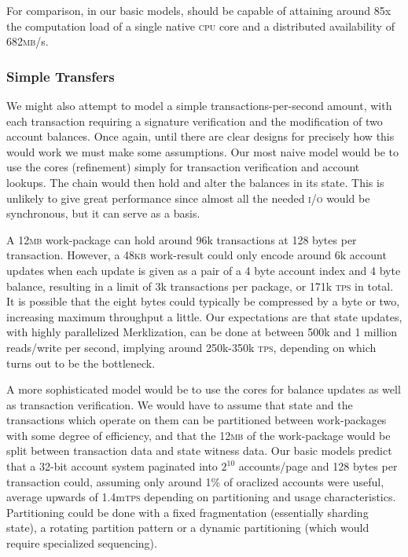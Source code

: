 For comparison, in our basic models, \Jam should be capable of attaining around 85x the computation load of a single native \textsc{cpu} core and a distributed availability of 682\textsc{mb}/s.

\subsubsection{Simple Transfers}
We might also attempt to model a simple transactions-per-second amount, with each transaction requiring a signature verification and the modification of two account balances. Once again, until there are clear designs for precisely how this would work we must make some assumptions. Our most naive model would be to use the \Jam cores (\ie refinement) simply for transaction verification and account lookups. The \Jam chain would then hold and alter the balances in its state. This is unlikely to give great performance since almost all the needed \textsc{i/o} would be synchronous, but it can serve as a basis.

A 12\textsc{mb} work-package can hold around 96k transactions at 128 bytes per transaction. However, a 48\textsc{kb} work-result could only encode around 6k account updates when each update is given as a pair of a 4 byte account index and 4 byte balance, resulting in a limit of 3k transactions per package, or 171k \textsc{tps} in total. It is possible that the eight bytes could typically be compressed by a byte or two, increasing maximum throughput a little. Our expectations are that state updates, with highly parallelized Merklization, can be done at between 500k and 1 million reads/write per second, implying around 250k-350k \textsc{tps}, depending on which turns out to be the bottleneck.

A more sophisticated model would be to use the \Jam cores for balance updates as well as transaction verification. We would have to assume that state and the transactions which operate on them can be partitioned between work-packages with some degree of efficiency, and that the 12\textsc{mb} of the work-package would be split between transaction data and state witness data. Our basic models predict that a 32-bit account system paginated into $2^{10}$ accounts/page and 128 bytes per transaction could, assuming only around 1\% of oraclized accounts were useful, average upwards of 1.4m\textsc{tps} depending on partitioning and usage characteristics. Partitioning could be done with a fixed fragmentation (essentially sharding state), a rotating partition pattern or a dynamic partitioning (which would require specialized sequencing).

